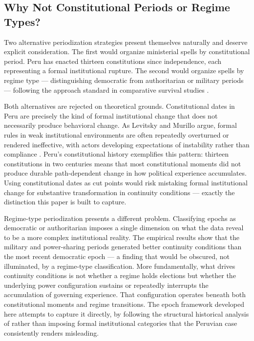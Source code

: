 \documentclass[doc, 12pt, a4paper,floatsintext]{apa7}
\begin{document}
\subsection{Why Not Constitutional Periods or Regime Types?}

Two alternative periodization strategies present themselves naturally 
and deserve explicit consideration. The first would organize ministerial 
spells by constitutional period. Peru has enacted thirteen constitutions 
since independence, each representing a formal institutional rupture. The 
second would organize spells by regime type --- distinguishing democratic 
from authoritarian or military periods --- following the approach standard 
in comparative survival studies \parencite{feliu_ribeiro_foreign_2023}.

Both alternatives are rejected on theoretical grounds. Constitutional 
dates in Peru are precisely the kind of formal institutional change that 
does not necessarily produce behavioral change. As Levitsky and Murillo 
argue, formal rules in weak institutional environments are often 
repeatedly overturned or rendered ineffective, with actors developing 
expectations of instability rather than compliance 
\parencite[123]{levitsky_variation_2009}. Peru's constitutional history 
exemplifies this pattern: thirteen constitutions in two centuries means 
that most constitutional moments did not produce durable path-dependent 
change in how political experience accumulates. Using constitutional dates 
as cut points would risk mistaking formal institutional change for 
substantive transformation in continuity conditions --- exactly the 
distinction this paper is built to capture.

Regime-type periodization presents a different problem. Classifying 
epochs as democratic or authoritarian imposes a single dimension on 
what the data reveal to be a more complex institutional reality. The 
empirical results show that the military and power-sharing periods 
generated better continuity conditions than the most recent democratic 
epoch --- a finding that would be obscured, not illuminated, by a 
regime-type classification. More fundamentally, what drives continuity 
conditions is not whether a regime holds elections but whether the 
underlying power configuration sustains or repeatedly interrupts the 
accumulation of governing experience. That configuration operates 
beneath both constitutional moments and regime transitions. The epoch 
framework developed here attempts to capture it directly, by following 
the structural historical analysis of \textcite{lopez_jimenez_peru_2025} 
rather than imposing formal institutional categories that the Peruvian 
case consistently renders misleading.
\end{document}
